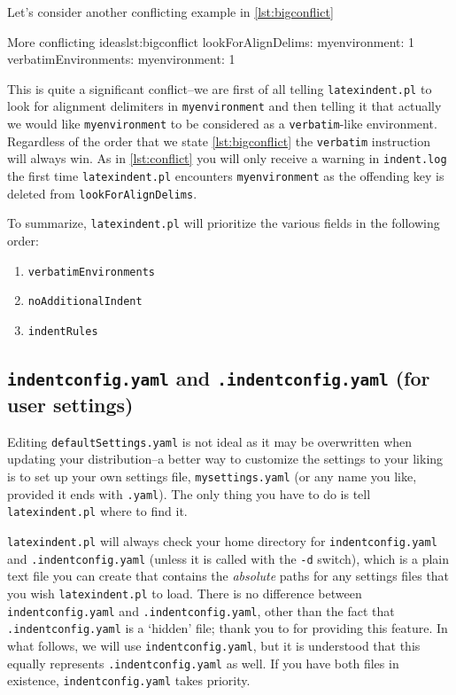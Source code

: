 \documentclass[11pt]{article}
\begin{document}
Let's consider another conflicting example in \cref{lst:bigconflict}
\begin{cmhlistings}[style=yaml]{More conflicting ideas}{lst:bigconflict}
lookForAlignDelims:
   myenvironment: 1
verbatimEnvironments:
   myenvironment: 1
\end{cmhlistings}
This is quite a significant conflict--we are first of all telling \lstinline!latexindent.pl!
to look for alignment delimiters in \lstinline!myenvironment! and then
telling it that actually we would like \lstinline!myenvironment! to be considered
as a \lstinline!verbatim!-like environment. Regardless of the order that we
state \cref{lst:bigconflict} the \lstinline!verbatim! instruction will always win.
As in \cref{lst:conflict} you will only receive a warning in \lstinline!indent.log! the
first time \lstinline!latexindent.pl! encounters \lstinline!myenvironment! as the
offending key is deleted from \lstinline!lookForAlignDelims!.

To summarize, \lstinline!latexindent.pl! will prioritize the various fields in the
following order:
\begin{enumerate}
	\item \lstinline!verbatimEnvironments!
	\item \lstinline!noAdditionalIndent!
	\item \lstinline!indentRules!
\end{enumerate}
\subsection{\lstinline!indentconfig.yaml! and \lstinline!.indentconfig.yaml! (for user settings)}\label{sec:indentconfig}
Editing \lstinline!defaultSettings.yaml! is not ideal as it may be overwritten when
updating your distribution--a better way to customize the settings to your liking
is to set up your own settings file,
\lstinline!mysettings.yaml! (or any name you like, provided it ends with \lstinline!.yaml!).
The only thing you have to do is tell \lstinline!latexindent.pl! where to find it.

\lstinline!latexindent.pl! will always check your home directory for \lstinline!indentconfig.yaml!
and  \lstinline!.indentconfig.yaml! (unless
it is called with the \lstinline!-d! switch),
which is a plain text file you can create that contains the \emph{absolute}
paths for any settings files that you wish \lstinline!latexindent.pl! to load. There is no difference
between \lstinline!indentconfig.yaml! and \lstinline!.indentconfig.yaml!, other than the
fact that \lstinline!.indentconfig.yaml! is a `hidden' file; thank you to \cite{jacobo-diaz-hidden-config}
for providing this feature. In what follows, we will use \lstinline!indentconfig.yaml!, but it
is understood that this equally represents \lstinline!.indentconfig.yaml! as well. If you
have both files in existence,  \lstinline!indentconfig.yaml! takes priority.
\end{document}
